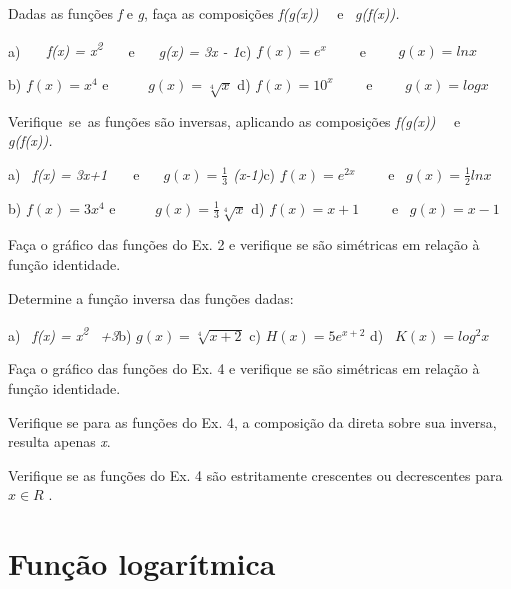 \begin{exercicios}
	\exitem{} Dadas as funções \textit{f} e \textit{g}, faça as composições \textit{f(g(x))}~~ e~ \textit{g(f(x)).}

    a)\textit{~~~ f(x) = x\textsuperscript{2}~~~ }e \textit{~~ g(x) = 3x - 1\quad \quad \quad }c) \textit{  \( f \left( x \right) =e^{x} \) \quad }~~~~e~~~~   \( g \left( x \right) =lnx \) 

    b) \quad  \( f \left( x \right) =x^{4} \) \quad e~~~~~  \( g \left( x \right) =\sqrt[4]{x} \) \quad \quad d)  \(  f \left( x \right) =10^{x} \) ~~~~e~~~~   \(  g \left( x \right) =logx  \) 

	\exitem{} Verifique~se~as funções são inversas, aplicando as composições   \textit{f(g(x))}~~ e~ \textit{g(f(x)).}
    
    \quad a)\textit{~ f(x) = 3x+1~~~ }e \textit{~~  \( g \left( x \right) =\frac{1}{3} \) (x-1)\quad }\quad c) \textit{  \( f \left( x \right) =e^{2x} \) }~~~~e~   \( g \left( x \right) =\frac{1}{2}lnx \) 

    \quad b)  \( f \left( x \right) =3x^{4} \) \quad e~~~~~  \( g \left( x \right) =\frac{1}{3}\sqrt[4]{x} \) \quad \quad d)  \(  f \left( x \right) =x+1 \) ~~~~e~   \(  g \left( x \right) =x-1 \) 

	\exitem{} Faça o gráfico das funções do Ex. 2 e verifique se são simétricas em relação à função identidade.

	\exitem{} Determine a função inversa das funções dadas:

    \quad a)\textit{~ f(x) = x\textsuperscript{2}~ +3\quad }b)  \( g \left( x \right) =\sqrt[4]{x+2} \) \quad c) \textit{  \( H \left( x \right) =5e^{x+2} \) \quad }d)~  \(  K \left( x \right) =log^{2}x  \) 

    \exitem{} Faça o gráfico das funções do Ex. 4 e verifique se são simétricas em relação à função identidade.

	\exitem{} Verifique se para as funções do Ex. 4, a composição da direta sobre sua inversa, resulta apenas \textit{x}.

    \exitem{} Verifique se as funções do Ex. 4 são estritamente crescentes ou decrescentes para  \( x  \in  R \) .
    
\end{exercicios}

\section{Função logarítmica}

